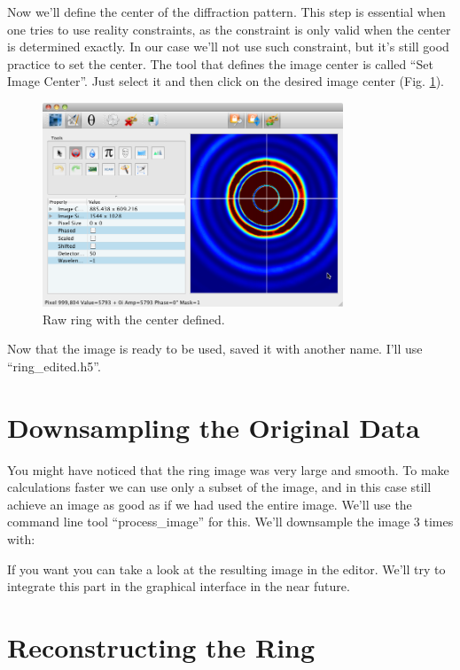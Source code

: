 \documentclass[a4paper]{article}
\begin{document}
Now we'll define the center of the diffraction pattern. This step is
essential when one tries to use reality constraints, as the constraint
is only valid when the center is determined exactly. In our case we'll
not use such constraint, but it's still good practice to set the
center. The tool that defines the image center is called ``Set Image
Center''. Just select it and then click on the desired image center
(Fig. \ref{find-center}).

\begin{figure}[h!]
\centering
\includegraphics[width=0.8\textwidth]{./find-center.png}
\caption{Raw ring with the center defined.}
\label{find-center}   
\end{figure}

Now that the image is ready to be used, saved it with another
name. I'll use ``ring\_edited.h5''. 

\section{Downsampling the Original Data}

You might have noticed that the ring image was very large and smooth. 
To make calculations faster we can use only a subset of the image, and
in this case still achieve an image as good as if we had used the
entire image. We'll use the command line tool ``process\_image'' for
this. We'll downsample the image 3 times with:


If you want you can take a look at the resulting image in the editor.
We'll try to integrate this part in the graphical interface in the
near future.

\section{Reconstructing the Ring}
\end{document}
